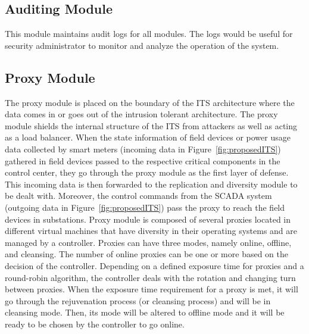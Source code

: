 \documentclass[preprint,number,12pt]{elsarticle}
\begin{document}
 \begin{comment}
\begin{figure}[!t]
\centering
\texttt{[image: proactiveRecovery]}
\caption{Proactive recovery mechanism.}
\label{fig:proactiveRecovery}
\end{figure}
\begin{figure}[!t]
\centering
\texttt{[image: ProcessLevelRecovery]}
\caption{Process level recovery in a replica.}
\label{fig:processLevelrecovery}
\end{figure}
\end{comment}
\subsection{Auditing Module}
This module maintains audit logs for all modules. The logs would be useful for security administrator to monitor and analyze the operation of the system. 
\subsection{Proxy Module}
The proxy module is placed on the boundary of the ITS architecture where the data comes in or goes out of the intrusion tolerant architecture. The proxy module shields the internal structure of the ITS from attackers as well as acting as a load balancer. When the state information of field devices or power usage data collected by smart meters (incoming data in Figure~\ref{fig:proposedITS}) gathered in field devices passed to the respective critical components in the control center, they go through the proxy module as the first layer of defense. This incoming data is then forwarded to the replication and diversity module to be dealt with. Moreover, the control commands from the SCADA system (outgoing data in Figure~\ref{fig:proposedITS}) pass the proxy to reach the field devices in substations. Proxy module is composed of several proxies located in different virtual machines that have diversity in their operating systems and are managed by a controller. Proxies can have three modes, namely online, offline, and cleansing. The number of online proxies can be one or more based on the decision of the controller. Depending on a defined exposure time for proxies and a round-robin algorithm, the controller deals with the rotation and changing turn between proxies\citep{Bangalore2009a}. When the exposure time requirement for a proxy is met, it will go through the rejuvenation process (or cleansing process) and will be in cleansing mode. Then, its mode will be altered to offline mode and it will be ready to be chosen by the controller to go online.
\end{document}
